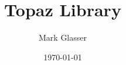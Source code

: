 \documentclass{article}
\begin{document}
\title{Topaz Library}
\author{Mark Glasser}
\date{\today}
\maketitle


\end{document}
